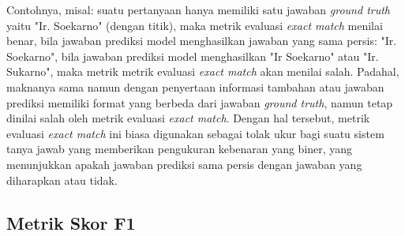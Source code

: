 Contohnya, misal: suatu pertanyaan hanya memiliki satu jawaban \emph{ground truth} yaitu "Ir. Soekarno" (dengan titik), maka metrik evaluasi \emph{exact match} menilai benar, bila jawaban prediksi model menghasilkan jawaban yang sama persis: "Ir. Soekarno", bila jawaban prediksi model menghasilkan "Ir Soekarno" atau "Ir. Sukarno", maka metrik metrik evaluasi \emph{exact match} akan menilai salah. Padahal, maknanya sama namun dengan penyertaan informasi tambahan atau jawaban prediksi memiliki format yang berbeda dari jawaban \emph{ground truth}, namun tetap dinilai salah oleh metrik evaluasi \emph{exact match}. Dengan hal tersebut, metrik evaluasi \emph{exact match} ini biasa digunakan sebagai tolak ukur bagi suatu sistem tanya jawab yang memberikan pengukuran kebenaran yang biner, yang menunjukkan apakah jawaban prediksi sama persis dengan jawaban yang diharapkan atau tidak.

\subsection{Metrik Skor F1}

